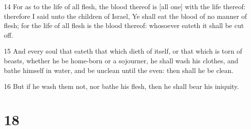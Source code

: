\par 14 For as to the life of all flesh, the blood thereof is [all one] with the life thereof: therefore I said unto the children of Israel, Ye shall eat the blood of no manner of flesh; for the life of all flesh is the blood thereof: whosoever eateth it shall be cut off.
\par 15 And every soul that eateth that which dieth of itself, or that which is torn of beasts, whether he be home-born or a sojourner, he shall wash his clothes, and bathe himself in water, and be unclean until the even: then shall he be clean.
\par 16 But if he wash them not, nor bathe his flesh, then he shall bear his iniquity.

\chapter{18}

